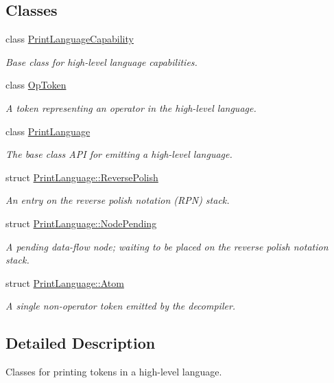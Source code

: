 \subsection*{Classes}
\begin{DoxyCompactItemize}
\item 
class \mbox{\hyperlink{class_print_language_capability}{Print\+Language\+Capability}}
\begin{DoxyCompactList}\small\item\em Base class for high-\/level language capabilities. \end{DoxyCompactList}\item 
class \mbox{\hyperlink{class_op_token}{Op\+Token}}
\begin{DoxyCompactList}\small\item\em A token representing an operator in the high-\/level language. \end{DoxyCompactList}\item 
class \mbox{\hyperlink{class_print_language}{Print\+Language}}
\begin{DoxyCompactList}\small\item\em The base class A\+PI for emitting a high-\/level language. \end{DoxyCompactList}\item 
struct \mbox{\hyperlink{struct_print_language_1_1_reverse_polish}{Print\+Language\+::\+Reverse\+Polish}}
\begin{DoxyCompactList}\small\item\em An entry on the reverse polish notation (R\+PN) stack. \end{DoxyCompactList}\item 
struct \mbox{\hyperlink{struct_print_language_1_1_node_pending}{Print\+Language\+::\+Node\+Pending}}
\begin{DoxyCompactList}\small\item\em A pending data-\/flow node; waiting to be placed on the reverse polish notation stack. \end{DoxyCompactList}\item 
struct \mbox{\hyperlink{struct_print_language_1_1_atom}{Print\+Language\+::\+Atom}}
\begin{DoxyCompactList}\small\item\em A single non-\/operator token emitted by the decompiler. \end{DoxyCompactList}\end{DoxyCompactItemize}


\subsection{Detailed Description}
Classes for printing tokens in a high-\/level language. 

